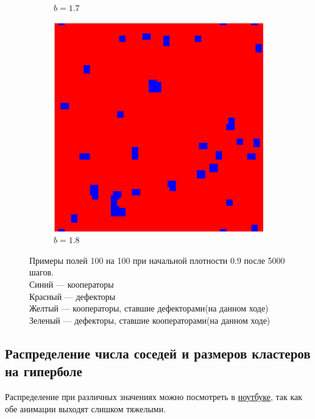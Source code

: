 \documentclass[12pt]{article}
\begin{document}
\begin{figure}[!htbp]
\begin{subfigure}{.33\textwidth}
            \caption{$b=1.7$}
            \label{fig:sub8}
            \end{subfigure}%
            \begin{subfigure}{.33\textwidth}
            \centering
            \includegraphics[width=.9\linewidth]{MeanFieldGame/snapshot_b=18.jpg}
            \caption{$b=1.8$}
            \label{fig:sub9}
            \end{subfigure}
        
            
            \caption{ Примеры полей 100 на 100 при начальной плотности $0.9$ после 5000 шагов.\\
            Синий — кооператоры\\
            Красный — дефекторы\\
            Желтый — кооператоры, ставшие дефекторами(на данном ходе)\\
            Зеленый — дефекторы, ставшие кооператорами(на данном ходе)}
            \label{fig:fields}
        \end{figure}
        
    \subsection{Распределение числа соседей и размеров кластеров на гиперболе}
        Распределение при различных значениях можно посмотреть в \href{https://github.com/ADmitri42/spatial-evolutionary-game/blob/master/2DMeanGame.ipynb}{ноутбуке}, так как обе анимации выходят слишком тяжелыми.
\end{document}
